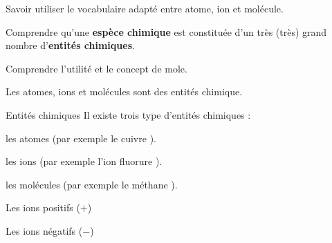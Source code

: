 \teteSndMole

\vspace*{-32pt}


\begin{objectifs}
  \item Savoir utiliser le vocabulaire adapté entre atome, ion et molécule.
  \item Comprendre qu'une \textbf{espèce chimique} est constituée d'un très (très) grand nombre d'\textbf{entités chimiques}.
  \item Comprendre l'utilité et le concept de mole.
\end{objectifs}

\begin{contexte}
  
  Les atomes, ions et molécules sont des entités chimique.
  
\end{contexte}



\begin{doc}{Entités chimiques}
  Il existe trois type d'entités chimiques :
  \begin{listePoints}
    \item les atomes (par exemple le cuivre ).
    \item les ions (par exemple l'ion fluorure ).
    \item les molécules (par exemple le méthane ).
  \end{listePoints}
  
  \begin{encart}
    Les ions positifs ($+$) \reponseLigne %
    
    Les ions négatifs ($-$) \dotfill %
  \end{encart}
\end{doc}

